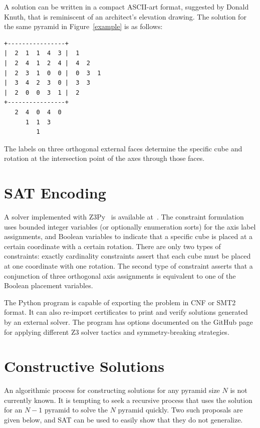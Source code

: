 \documentclass[conference]{IEEEtran}
\begin{document}
A solution can be written in a compact ASCII-art format, suggested by Donald Knuth, that is reminiscent of an architect's elevation drawing.
The solution for the same pyramid in Figure~\ref{example} is as follows:

\begin{center}
\begin{small}
\begin{BVerbatim}
+----------------+
|  2  1  1  4  3 |  1
|  2  4  1  2  4 |  4  2
|  2  3  1  0  0 |  0  3  1
|  3  4  2  3  0 |  3  3
|  2  0  0  3  1 |  2
+----------------+
   2  4  0  4  0
      1  1  3
         1
\end{BVerbatim}
\end{small}
\end{center}

The labels on three orthogonal external faces determine the specific cube and rotation at the intersection point of the axes through those faces.

\section{SAT Encoding}

A solver implemented with Z3Py~\cite{z3} is available at~\cite{b1}.
The constraint formulation uses bounded integer variables (or optionally enumeration sorts) for the axis label assignments,
and Boolean variables to indicate that a specific cube is placed at a certain coordinate with a certain rotation.
There are only two types of constraints: exactly cardinality constraints assert that each cube must be placed at one coordinate with one rotation.
The second type of constraint asserts that a conjunction of three orthogonal axis assignments is equivalent to one of the Boolean placement variables.

The Python program is capable of exporting the problem in CNF or SMT2 format.
It can also re-import certificates to print and verify solutions generated by an external solver.
The program has options documented on the GitHub page for applying different Z3 solver tactics and symmetry-breaking strategies.

\section{Constructive Solutions}

An algorithmic process for constructing solutions for any pyramid size $N$ is not currently known.
It is tempting to seek a recursive process that uses the solution for an $N-1$ pyramid to solve the $N$ pyramid quickly.
Two such proposals are given below, and SAT can be used to easily show that they do not generalize.
\end{document}
